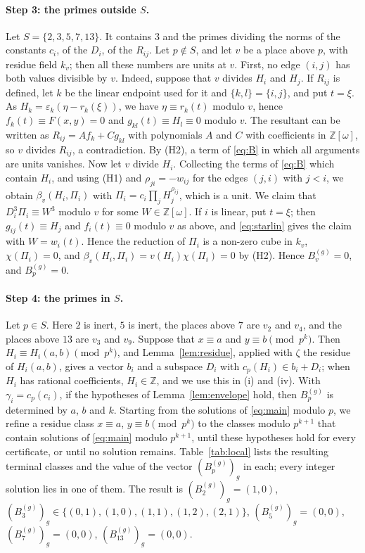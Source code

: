 \documentclass[11pt]{article}
\newcommand{\Z}{\mathbb{Z}}
\begin{document}
\paragraph{Step 3: the primes outside $S$.} Let $S=\{2,3,5,7,13\}$. It contains $3$ and the primes dividing the norms of the constants $c_i$, of the $D_i$, of the $R_{ij}$. Let $p\notin S$, and let $v$ be a place above $p$, with residue field $k_v$; then all these numbers are units at $v$. First, no edge $(i,j)$ has both values divisible by $v$. Indeed, suppose that $v$ divides $H_i$ and $H_j$. If $R_{ij}$ is defined, let $k$ be the linear endpoint used for it and $\{k,l\}=\{i,j\}$, and put $t=\xi$. As $H_k=\varepsilon_k(\eta-r_k(\xi))$, we have $\eta\equiv r_k(t)$ modulo $v$, hence $f_k(t)\equiv F(x,y)=0$ and $g_{kl}(t)\equiv H_l\equiv0$ modulo $v$. The resultant can be written as $R_{ij}=Af_k+Cg_{kl}$ with polynomials $A$ and $C$ with coefficients in $\Z[\omega]$, so $v$ divides $R_{ij}$, a contradiction. By (H2), a term of \eqref{eq:B} in which all arguments are units vanishes. Now let $v$ divide $H_i$. Collecting the terms of \eqref{eq:B} which contain $H_i$, and using (H1) and $\rho_{ji}=-w_{ij}$ for the edges $(j,i)$ with $j<i$, we obtain $\beta_v(H_i,\Pi_i)$ with $\Pi_i=c_i\prod_jH_j^{\rho_{ij}}$, which is a unit. We claim that $D_i^3\Pi_i\equiv W^3$ modulo $v$ for some $W\in\Z[\omega]$. If $i$ is linear, put $t=\xi$; then $g_{ij}(t)\equiv H_j$ and $f_i(t)\equiv0$ modulo $v$ as above, and \eqref{eq:starlin} gives the claim with $W=w_i(t)$. Hence the reduction of $\Pi_i$ is a non-zero cube in $k_v$, $\chi(\Pi_i)=0$, and $\beta_v(H_i,\Pi_i)=v(H_i)\chi(\Pi_i)=0$ by (H2). Hence $B^{(g)}_v=0$, and $B^{(g)}_p=0$.

\paragraph{Step 4: the primes in $S$.} Let $p\in S$. Here $2$ is inert, $5$ is inert, the places above $7$ are $v_{2}$ and $v_{4}$, and the places above $13$ are $v_{3}$ and $v_{9}$. Suppose that $x\equiv a$ and $y\equiv b\pmod{p^k}$. Then $H_i\equiv H_i(a,b)\pmod{p^k}$, and Lemma~\ref{lem:residue}, applied with $\zeta$ the residue of $H_i(a,b)$, gives a vector $b_i$ and a subspace $D_i$ with $c_p(H_i)\in b_i+D_i$; when $H_i$ has rational coefficients, $H_i\in\Z$, and we use this in (i) and (iv). With $\gamma_i=c_p(c_i)$, if the hypotheses of Lemma~\ref{lem:envelope} hold, then $B^{(g)}_p$ is determined by $a$, $b$ and $k$. Starting from the solutions of \eqref{eq:main} modulo $p$, we refine a residue class $x\equiv a$, $y\equiv b\pmod{p^k}$ to the classes modulo $p^{k+1}$ that contain solutions of \eqref{eq:main} modulo $p^{k+1}$, until these hypotheses hold for every certificate, or until no solution remains. Table~\ref{tab:local} lists the resulting terminal classes and the value of the vector $(B^{(g)}_p)_g$ in each; every integer solution lies in one of them. The result is $(B^{(g)}_{2})_g=(1,0)$, $(B^{(g)}_{3})_g\in\{(0,1),\allowbreak (1,0),\allowbreak (1,1),\allowbreak (1,2),\allowbreak (2,1)\}$, $(B^{(g)}_{5})_g=(0,0)$, $(B^{(g)}_{7})_g=(0,0)$, $(B^{(g)}_{13})_g=(0,0)$.
\end{document}
